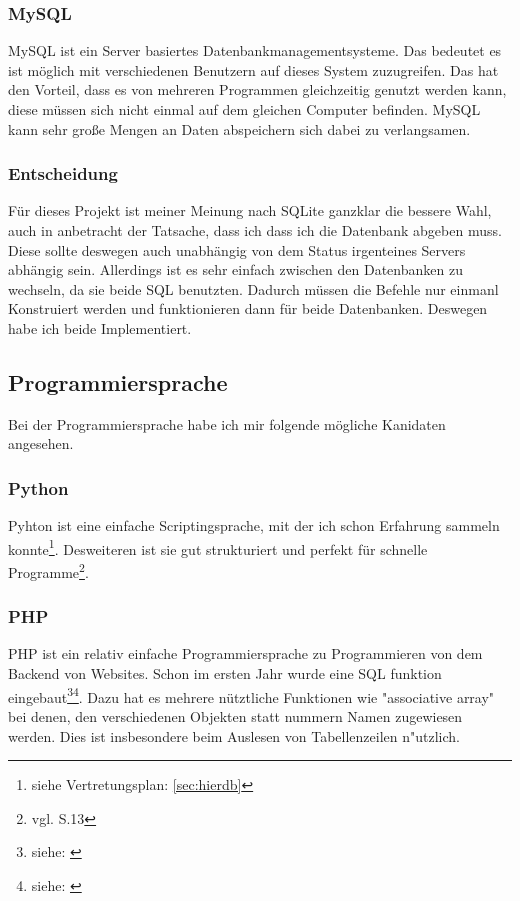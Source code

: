 \documentclass[a4paper, 12pt]{article}
\theoremstyle{plain}
\theoremstyle{definition}
\begin{document}
	\subsubsection{MySQL}
	\label{sec:MySQL}
	MySQL ist ein Server basiertes Datenbankmanagementsysteme. Das bedeutet es ist möglich mit verschiedenen Benutzern auf dieses System zuzugreifen. Das hat den Vorteil, dass es von mehreren Programmen gleichzeitig genutzt werden kann, diese müssen sich nicht einmal auf dem gleichen Computer befinden. MySQL kann sehr große Mengen an Daten abspeichern sich dabei zu verlangsamen.
	
	\subsubsection{Entscheidung}
	Für dieses Projekt ist meiner Meinung nach SQLite ganzklar die bessere Wahl, auch in anbetracht der Tatsache, dass ich dass ich die Datenbank abgeben muss. Diese sollte deswegen auch unabhängig von dem Status irgenteines Servers abhängig sein. Allerdings ist es sehr einfach zwischen den Datenbanken zu wechseln, da sie beide SQL benutzten. Dadurch müssen die Befehle nur einmanl Konstruiert werden und funktionieren dann für beide Datenbanken. Deswegen habe ich beide Implementiert.
	
	\subsection{Programmiersprache}
	Bei der Programmiersprache habe ich mir folgende mögliche Kanidaten angesehen.
	\subsubsection{Python}
	\label{sec:py}
	Pyhton ist eine einfache Scriptingsprache, mit der ich schon Erfahrung sammeln konnte\footnote{siehe Vertretungsplan: \ref{sec:hierdb}}. Desweiteren ist sie gut strukturiert und perfekt für schnelle Programme\footnote{vgl. \cite{Dave13} S.13}.
	
	\subsubsection{PHP}
	\label{sec:php}
	PHP ist ein relativ einfache Programmiersprache zu Programmieren von dem Backend von Websites. Schon im ersten Jahr wurde eine SQL funktion eingebaut\footnote{siehe: \cite{php1994}}\footnote{siehe: \cite{phpGesch}}. Dazu hat es mehrere nütztliche Funktionen wie "associative array" bei denen, den verschiedenen Objekten statt nummern Namen zugewiesen werden. Dies ist insbesondere beim Auslesen von Tabellenzeilen n"utzlich.
	
\end{document}
